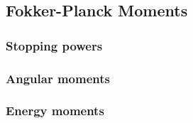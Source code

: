 \subsection{Fokker-Planck Moments}

\subsubsection{Stopping powers}

\subsubsection{Angular moments}

\subsubsection{Energy moments}